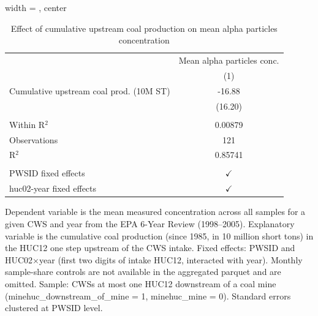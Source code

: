 
\begin{table}[htbp]
   
   \caption{\label{tab:6yr_huc02fe_alpha_particles_mean} Effect of cumulative upstream coal production on mean alpha particles concentration}
   \bigskip
   
   \centering
   
   \begin{adjustbox}{width = \textwidth, center}
      
      
      \begin{tabular}{lc}
         \toprule
         
                                                 & Mean alpha particles conc.\\  
         
                                                 & (1)\\  
         
         \midrule 
         Cumulative upstream coal prod. (10M ST) & -16.88\\   
                                                 & (16.20)\\   
         
          \\
         
         Within R$^2$                            & 0.00879\\  
         Observations                            & 121\\  
         R$^2$                                   & 0.85741\\  
         
          \\
         
         PWSID fixed effects                     & $\checkmark$\\   
         huc02-year fixed effects                & $\checkmark$\\   
         
         \bottomrule
         
      \end{tabular}
      
      
      
   \end{adjustbox}
      {\tiny\linespread{1}\selectfont \par \raggedright 
   Dependent variable is the mean measured concentration across all samples for a given CWS and year from the EPA 6-Year Review (1998--2005). Explanatory variable is the cumulative coal production (since 1985, in 10 million short tons) in the HUC12 one step upstream of the CWS intake. Fixed effects: PWSID and HUC02$\times$year (first two digits of intake HUC12, interacted with year). Monthly sample-share controls are not available in the aggregated parquet and are omitted. Sample: CWSs at most one HUC12 downstream of a coal mine (minehuc\_downstream\_of\_mine = 1, minehuc\_mine = 0). Standard errors clustered at PWSID level.}
   
\end{table}


